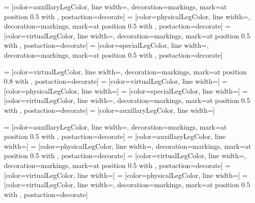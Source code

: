  = [color=auxillaryLegColor, line width=, decoration={markings, mark=at position 0.5 with {}}, postaction={decorate}]
 = [color=physicalLegColor, line width=, decoration={markings, mark=at position 0.5 with {}}, postaction={decorate}]
 = [color=virtualLegColor, line width=, decoration={markings, mark=at position 0.5 with {}}, postaction={decorate}]
 = [color=specialLegColor, line width=, decoration={markings, mark=at position 0.5 with {}}, postaction={decorate}]

 = [color=virtualLegColor, line width=, decoration={markings, mark=at position 0.8 with {}}, postaction={decorate}]
 = [color=virtualLegColor, line width=]
 = [color=physicalLegColor, line width=]
 = [color=specialLegColor, line width=]
 = [color=virtualLegColor, line width=, decoration={markings, mark=at position 0.5 with {}}, postaction={decorate}]
 = [color=auxillaryLegColor, line width=]

 = [color=auxillaryLegColor, line width=\lineWidthThin, decoration={markings, mark=at position 0.5 with {\pgftransformscale{\arrowScaleSmall}}}, postaction={decorate}]
 = [color=auxillaryLegColor, line width=\lineWidthThin]
 = [color=physicalLegColor, line width=\lineWidthThin, decoration={markings, mark=at position 0.5 with {\pgftransformscale{\arrowScaleSmall}}}, postaction={decorate}]
 = [color=virtualLegColor, line width=\lineWidthThin, decoration={markings, mark=at position 0.5 with {\pgftransformscale{\arrowScaleSmall}}}, postaction={decorate}]
 = [color=virtualLegColor, line width=\lineWidthThin]
 = [color=physicalLegColor, line width=\lineWidthThin]
 = [color=virtualLegColor, line width=\lineWidthThin, decoration={markings, mark=at position 0.5 with {\pgftransformscale{\arrowScaleSmall}}}, postaction={decorate}]

